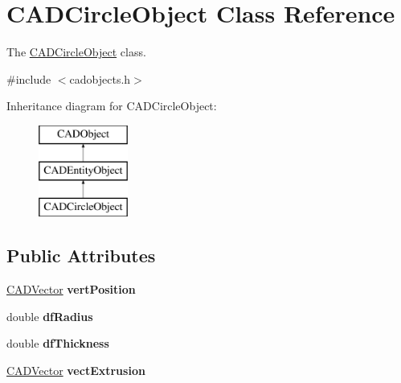 \hypertarget{class_c_a_d_circle_object}{}\section{C\+A\+D\+Circle\+Object Class Reference}
\label{class_c_a_d_circle_object}


The \hyperlink{class_c_a_d_circle_object}{C\+A\+D\+Circle\+Object} class.  




{\ttfamily \#include $<$cadobjects.\+h$>$}

Inheritance diagram for C\+A\+D\+Circle\+Object\+:\begin{figure}[H]
\begin{center}
\leavevmode
\includegraphics[height=3.000000cm]{class_c_a_d_circle_object}
\end{center}
\end{figure}
\subsection*{Public Attributes}
\begin{DoxyCompactItemize}
\item 
\hyperlink{class_c_a_d_vector}{C\+A\+D\+Vector} {\bfseries vert\+Position}\hypertarget{class_c_a_d_circle_object_a8e9f8af88cd3bbaf012b8535d91e703a}{}\label{class_c_a_d_circle_object_a8e9f8af88cd3bbaf012b8535d91e703a}

\item 
double {\bfseries df\+Radius}\hypertarget{class_c_a_d_circle_object_aa57ef49fbb95694f489f6afabae8e7f7}{}\label{class_c_a_d_circle_object_aa57ef49fbb95694f489f6afabae8e7f7}

\item 
double {\bfseries df\+Thickness}\hypertarget{class_c_a_d_circle_object_a6b4c5969fe708a4dca4e51e4e47860b6}{}\label{class_c_a_d_circle_object_a6b4c5969fe708a4dca4e51e4e47860b6}

\item 
\hyperlink{class_c_a_d_vector}{C\+A\+D\+Vector} {\bfseries vect\+Extrusion}\hypertarget{class_c_a_d_circle_object_a69866173a8fd2af7ba266c067bc75fa3}{}\label{class_c_a_d_circle_object_a69866173a8fd2af7ba266c067bc75fa3}

\end{DoxyCompactItemize}

